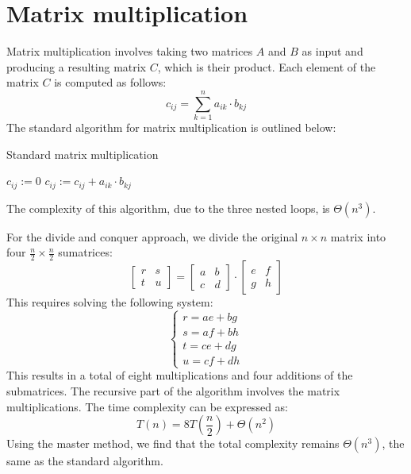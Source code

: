 \section{Matrix multiplication}

Matrix multiplication involves taking two matrices $A$ and $B$ as input and producing a resulting matrix $C$, which is their product.
Each element of the matrix $C$ is computed as follows:
\[c_{ij}=\sum_{k=1}^{n}a_{ik}\cdot b_{kj}\]
The standard algorithm for matrix multiplication is outlined below:
\begin{algorithm}[H]
    \caption{Standard matrix multiplication}
        \begin{algorithmic}[1]
                    \State $c_{ij} := 0$
                        \State $c_{ij} := c_{ij}+a_{ik}\cdot b_{kj}$
                    \EndFor
                \EndFor
            \EndFor
        \end{algorithmic}
\end{algorithm}
The complexity of this algorithm, due to the three nested loops, is $\Theta(n^3)$.

For the divide and conquer approach, we divide the original $n\times n$ matrix into four $\frac{n}{2}\times\frac{n}{2}$ sumatrices: 
\[\begin{bmatrix} r & s \\ t & u \end{bmatrix}=\begin{bmatrix} a & b \\ c & d \end{bmatrix} \cdot \begin{bmatrix} e & f \\ g & h \end{bmatrix}\]
This requires solving the following system:
\[\begin{cases} r = ae + bg \\ s = af + bh \\ t = ce + dg \\ u = cf + dh \end{cases}\]
This results in a total of eight multiplications and four additions of the submatrices. 
The recursive part of the algorithm involves the matrix multiplications. 
The time complexity can be expressed as:
\[T(n)=8T\left(\dfrac{n}{2}\right)+\Theta(n^2)\]
Using the master method, we find that the total complexity remains $\Theta(n^3)$, the same as the standard algorithm.


